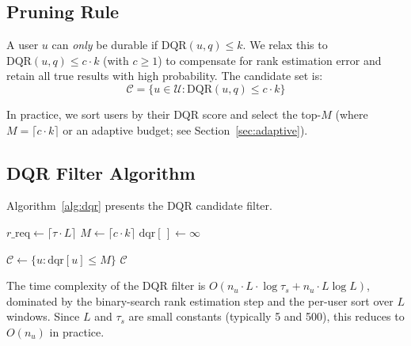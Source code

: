 \subsection{Pruning Rule}

A user $u$ can \emph{only} be durable if $\text{DQR}(u, q) \leq k$. We relax this to $\text{DQR}(u, q) \leq c \cdot k$ (with $c \geq 1$) to compensate for rank estimation error and retain all true results with high probability. The candidate set is:
\[
  \mathcal{C} = \{u \in \mathcal{U} : \text{DQR}(u, q) \leq c \cdot k\}
\]

In practice, we sort users by their DQR score and select the top-$M$ (where $M = \lceil c \cdot k \rceil$ or an adaptive budget; see Section~\ref{sec:adaptive}).

\subsection{DQR Filter Algorithm}

Algorithm~\ref{alg:dqr} presents the DQR candidate filter.

\begin{algorithm}[htbp]
\SetAlgoLined
{}

$r\_\text{req} \leftarrow \lceil \tau \cdot L \rceil$ 
$M \leftarrow \lceil c \cdot k \rceil$ 
$\text{dqr}[\,] \leftarrow \infty$ 

$\mathcal{C} \leftarrow \{u : \text{dqr}[u] \leq M\}$\;
\Return $\mathcal{C}$
\caption{DQR Candidate Filter}
\label{alg:dqr}
\end{algorithm}

The time complexity of the DQR filter is $O(n_u \cdot L \cdot \log \tau_s + n_u \cdot L \log L)$, dominated by the binary-search rank estimation step and the per-user sort over $L$ windows. Since $L$ and $\tau_s$ are small constants (typically 5 and 500), this reduces to $O(n_u)$ in practice.

